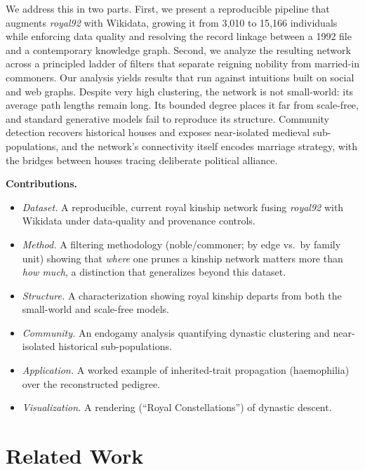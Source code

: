 We address this in two parts. First, we present a reproducible pipeline that augments \emph{royal92} with Wikidata, growing it from 3{,}010 to 15{,}166 individuals while enforcing data quality and resolving the record linkage between a 1992 file and a contemporary knowledge graph. Second, we analyze the resulting network across a principled ladder of filters that separate reigning nobility from married-in commoners.
Our analysis yields results that run against intuitions built on social and web graphs. Despite very high clustering, the network is not small-world: its average path lengths remain long. Its bounded degree places it far from scale-free, and standard generative models fail to reproduce its structure. Community detection recovers historical houses and exposes near-isolated medieval sub-populations, and the network's connectivity itself encodes marriage strategy, with the bridges between houses tracing deliberate political alliance.

\smallskip\noindent\textbf{Contributions.}
\begin{itemize}
\item \emph{Dataset.} A reproducible, current royal kinship network fusing \emph{royal92} with Wikidata under data-quality and provenance controls.
\item \emph{Method.} A filtering methodology (noble/commoner; by edge vs.\ by family unit) showing that \emph{where} one prunes a kinship network matters more than \emph{how much}, a distinction that generalizes beyond this dataset.
\item \emph{Structure.} A characterization showing royal kinship departs from both the small-world \cite{watts1998collective} and scale-free \cite{barabasi1999emergence} models.
\item \emph{Community.} An endogamy analysis quantifying dynastic clustering and near-isolated historical sub-populations.
\item \emph{Application.} A worked example of inherited-trait propagation (haemophilia) over the reconstructed pedigree.
\item \emph{Visualization.} A rendering (``Royal Constellations'') of dynastic descent.
\end{itemize}

\section{Related Work}
\label{sec:related}

